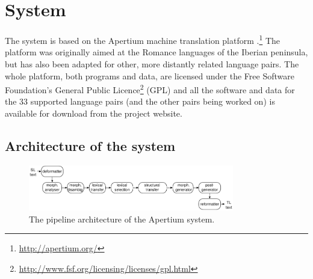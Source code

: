\documentclass[10pt,a5paper,twoside]{article}
\begin{document}
\section{System}
\label{sec:sys}
The system is based on the Apertium machine translation platform \citep{apertium/2011}.\footnote{\url{http://apertium.org/}} The platform was originally aimed at the Romance languages of the Iberian peninsula, but has also been adapted for other, more distantly related language pairs. The whole platform, both programs and data, are licensed under the Free Software Foundation's General Public Licence\footnote{\url{http://www.fsf.org/licensing/licenses/gpl.html}} (GPL) and all the software and data for the 33 supported language pairs (and the other pairs being worked on) is available for download from the project website.

\subsection{Architecture of the system}

\begin{figure}[htbp]
\begin{center}
 \includegraphics[width=0.8\textwidth]{architecture.pdf}
\end{center}
\caption{The pipeline architecture of the Apertium system.}
\label{fig:modules}
\end{figure}
\end{document}
